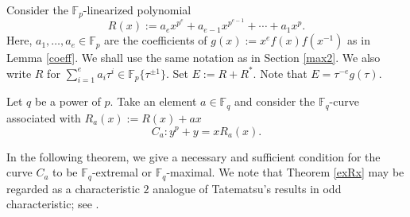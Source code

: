\documentclass[12pt,a4paper]{amsart}
\theoremstyle{definition}
\def\F{{\mathbb F}}
\theoremstyle{remark}
\begin{document}
\medskip

Consider the $\F_p$-linearized polynomial
\[
R(x):=a_ex^{p^e}+a_{e-1}x^{p^{e-1}}+\cdots+a_1x^p.
\]
Here, $a_1,\ldots,a_e \in \F_p$ are the coefficients of
$g(x):=x^ef(x)f(x^{-1})$ 
as in Lemma \ref{coeff}. 
We shall use the same notation as in
Section \ref{max2}.
We also write $R$ for $\sum_{i=1}^e a_i \tau^i \in \F_p\{\tau^{\pm1}\}$. 
Set $E:=R+R^\ast$. 
Note that $E=\tau^{-e}g(\tau)$. 

Let $q$ be a power of $p$. 
Take an element $a\in \F_q$ and consider the $\F_q$-curve
associated with $R_a(x) := R(x) + ax$
\begin{equation}\label{exf}
C_a\colon y^p + y = x R_a(x). 
\end{equation} 

In the following theorem, we give a necessary and sufficient condition for the curve $C_a$ to be $\F_q$-extremal or $\F_q$-maximal.
We note that Theorem \ref{exRx} may be regarded as a characteristic $2$ analogue of Tatematsu's results in odd characteristic; see \cite[Theorem 1.1]{ITT}. 
\end{document}
